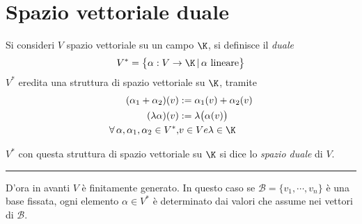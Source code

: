 \section{Spazio vettoriale duale}

Si consideri $ V $ spazio vettoriale su un campo $ \K $, si definisce il \textit{duale} \begin{equation}
    V^{*}=\bigl\{\alpha: V\to \K\,|\, \alpha\text{ lineare}\bigr\}
\end{equation} $ V^{*} $ eredita una struttura di spazio vettoriale su $ \K $, tramite \begin{align*}
    (\alpha_1+\alpha_2)(v) &:= \alpha_1(v)+\alpha_2(v)\\
    (\lambda\alpha)(v)&:= \lambda\bigl(\alpha(v)\bigr)\\
    \forall\, \alpha, \alpha_1, \alpha_2 \in V^{*}, &v \in V e \lambda \in \K
\end{align*}

$ V^{*} $ con questa struttura di spazio vettoriale su $ \K $ si dice lo \textit{spazio duale} di $ V $.

\rule{7em}{.4pt}

D'ora in avanti $ V $ è finitamente generato. In questo caso se $ \mathscr{B} =\{v_1, \cdots, v_{n}\} $ è una base fissata, ogni elemento $ \alpha \in V^{*} $ è determinato dai valori che assume nei vettori di $ \mathscr{B} $.

